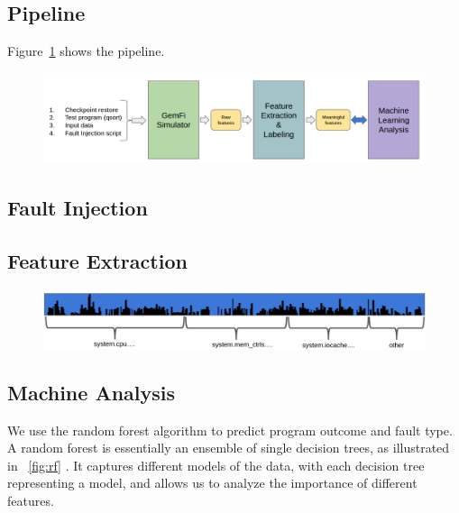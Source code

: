 \documentclass{sig-alternate}
\begin{document}
\subsection{Pipeline}
Figure~\ref{fig:pipeline} shows the pipeline.
\begin{figure}[t]
\begin{center}
   \includegraphics[width=0.95\linewidth]{./figures/pipeline.png}
\end{center}
   \caption{}
\label{fig:pipeline}
\end{figure}

\subsection{Fault Injection}

\subsection{Feature Extraction}

\begin{figure}[t]
\begin{center}
   \includegraphics[width=0.95\linewidth]{./figures/feat_dist.png}
\end{center}
   \caption{}
\label{fig:feat-dist}
\end{figure}

\subsection{Machine Analysis}
We use the random forest algorithm to predict program outcome and fault type. A random forest is essentially an ensemble of single decision trees, as illustrated in ~\ref{fig:rf} \cite{breiman2001random}. It captures different models of the data, with each decision tree representing a model, and allows us to analyze the importance of different features. 
\end{document}
